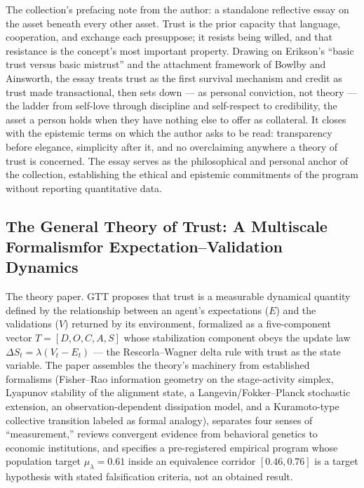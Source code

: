 \documentclass[11pt]{article}
\begin{document}
The collection's prefacing note from the author: a standalone reflective essay
on the asset beneath every other asset. Trust is
the prior capacity that language, cooperation, and exchange each presuppose; it
resists being willed, and that resistance is the concept's most important
property. Drawing on Erikson's ``basic trust versus basic mistrust'' and the
attachment framework of Bowlby and Ainsworth, the essay treats trust as the
first survival mechanism and credit as trust made transactional, then sets down
--- as personal conviction, not theory --- the ladder from self-love through
discipline and self-respect to credibility, the asset a person holds when they
have nothing else to offer as collateral. It closes with the epistemic terms on
which the author asks to be read: transparency before elegance, simplicity after
it, and no overclaiming anywhere a theory of trust is concerned. The essay serves as the philosophical and personal anchor of the collection, establishing the ethical and epistemic commitments of the program without reporting quantitative data.

\subsection*{The General Theory of Trust: A Multiscale Formalism\newline for Expectation--Validation Dynamics}

The theory paper. GTT proposes that trust is a measurable dynamical quantity
defined by the relationship between an agent's expectations ($E$) and the
validations ($V$) returned by its environment, formalized as a five-component
vector $T = [D, O, C, A, S]$ whose stabilization component obeys the update law
$\Delta S_t = \lambda(V_t - E_t)$ --- the Rescorla--Wagner delta rule with trust
as the state variable. The paper assembles the theory's machinery from
established formalisms (Fisher--Rao information geometry on the stage-activity
simplex, Lyapunov stability of the alignment state, a Langevin/Fokker--Planck
stochastic extension, an observation-dependent dissipation model, and a
Kuramoto-type collective transition labeled as formal analogy), separates four
senses of ``measurement,'' reviews convergent evidence from behavioral genetics
to economic institutions, and specifies a pre-registered empirical program whose
population target $\mu_\lambda = 0.61$ inside an equivalence corridor
$[0.46, 0.76]$ is a target hypothesis with stated falsification criteria, not an
obtained result.
\end{document}
